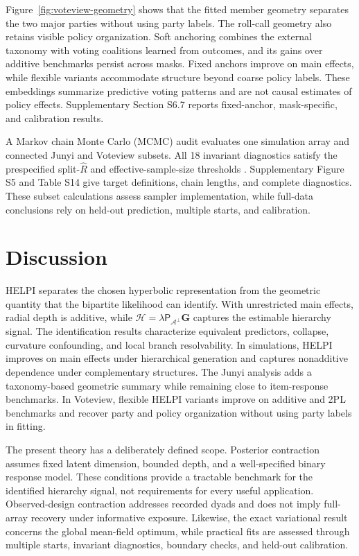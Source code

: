 \documentclass[
  12pt]{article}
\theoremstyle{definition}
\theoremstyle{plain}
\newcommand{\calA}{\mathcal A}
\newcommand{\projA}{\mathsf P_{\calA^\perp}}
\newcommand{\bG}{\mathbf G}
\begin{document}
Figure~\ref{fig:voteview-geometry} shows that the fitted member geometry separates the two major parties without using party labels. The roll-call geometry also retains visible policy organization. Soft anchoring combines the external taxonomy with voting coalitions learned from outcomes, and its gains over additive benchmarks persist across masks. Fixed anchors improve on main effects, while flexible variants accommodate structure beyond coarse policy labels. These embeddings summarize predictive voting patterns and are not causal estimates of policy effects. Supplementary Section S6.7 reports fixed-anchor, mask-specific, and calibration results.

A Markov chain Monte Carlo (MCMC) audit evaluates one simulation array and connected Junyi and Voteview subsets. All 18 invariant diagnostics satisfy the prespecified split-\(\widehat R\) and effective-sample-size thresholds \citep{vehtari_2021_RankNormalizationFoldingLocalization}. Supplementary Figure S5 and Table S14 give target definitions, chain lengths, and complete diagnostics. These subset calculations assess sampler implementation, while full-data conclusions rely on held-out prediction, multiple starts, and calibration.
\section{Discussion}
\label{sec:discussion}

HELPI separates the chosen hyperbolic representation from the geometric quantity that the bipartite likelihood can identify. With unrestricted main effects, radial depth is additive, while $\mathcal H=\lambda\projA\bG$ captures the estimable hierarchy signal. The identification results characterize equivalent predictors, collapse, curvature confounding, and local branch resolvability. In simulations, HELPI improves on main effects under hierarchical generation and captures nonadditive dependence under complementary structures. The Junyi analysis adds a taxonomy-based geometric summary while remaining close to item-response benchmarks. In Voteview, flexible HELPI variants improve on additive and 2PL benchmarks and recover party and policy organization without using party labels in fitting.

The present theory has a deliberately defined scope. Posterior contraction assumes fixed latent dimension, bounded depth, and a well-specified binary response model. These conditions provide a tractable benchmark for the identified hierarchy signal, not requirements for every useful application. Observed-design contraction addresses recorded dyads and does not imply full-array recovery under informative exposure. Likewise, the exact variational result concerns the global mean-field optimum, while practical fits are assessed through multiple starts, invariant diagnostics, boundary checks, and held-out calibration.
\end{document}
